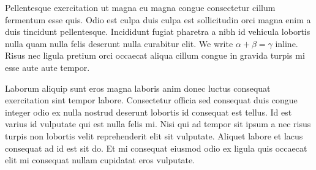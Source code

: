 Pellentesque exercitation ut magna eu magna congue consectetur cillum
fermentum esse quis. Odio est culpa duis culpa est sollicitudin orci
magna enim a duis tincidunt pellentesque. Incididunt fugiat pharetra a
nibh id vehicula lobortis nulla quam nulla felis deserunt nulla
curabitur elit. We write $\alpha + \beta = \gamma$ inline. Risus nec
ligula pretium orci occaecat aliqua cillum congue in gravida turpis mi
esse aute aute tempor.

Laborum aliquip sunt eros magna laboris anim donec luctus consequat
exercitation sint tempor labore. Consectetur officia sed consequat duis
congue integer odio ex nulla nostrud deserunt lobortis id consequat est
tellus. Id est varius id vulputate qui est nulla felis mi. Nisi qui ad
tempor sit ipsum a nec risus turpis non lobortis velit reprehenderit
elit sit vulputate. Aliquet labore et lacus consequat ad id est sit do.
Et mi consequat eiusmod odio ex ligula quis occaecat elit mi consequat
nullam cupidatat eros vulputate.
